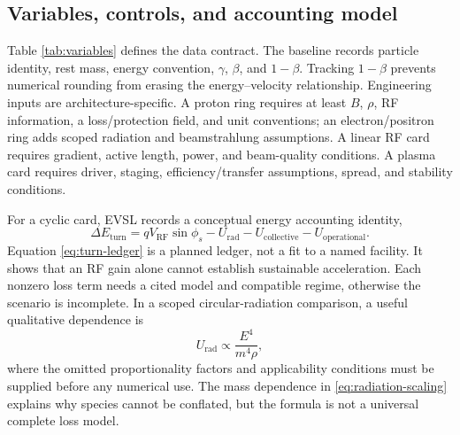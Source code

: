 \documentclass[conference]{../../../../Conference-LaTeX-template_10-17-19/IEEEtran}
\begin{document}
\subsection{Variables, controls, and accounting model}
Table \ref{tab:variables} defines the data contract. The baseline records particle identity, rest mass, energy convention, $\gamma$, $\beta$, and $1-\beta$. Tracking $1-\beta$ prevents numerical rounding from erasing the energy--velocity relationship. Engineering inputs are architecture-specific. A proton ring requires at least $B$, $\rho$, RF information, a loss/protection field, and unit conventions; an electron/positron ring adds scoped radiation and beamstrahlung assumptions. A linear RF card requires gradient, active length, power, and beam-quality conditions. A plasma card requires driver, staging, efficiency/transfer assumptions, spread, and stability conditions.

For a cyclic card, EVSL records a conceptual energy accounting identity,
\begin{equation}
\Delta E_{\mathrm{turn}}=qV_{\mathrm{RF}}\sin\phi_s-U_{\mathrm{rad}}-U_{\mathrm{collective}}-U_{\mathrm{operational}}.
\label{eq:turn-ledger}
\end{equation}
Equation \eqref{eq:turn-ledger} is a planned ledger, not a fit to a named facility. It shows that an RF gain alone cannot establish sustainable acceleration. Each nonzero loss term needs a cited model and compatible regime, otherwise the scenario is incomplete. In a scoped circular-radiation comparison, a useful qualitative dependence is
\begin{equation}
U_{\mathrm{rad}}\propto\frac{E^4}{m^4\rho},
\label{eq:radiation-scaling}
\end{equation}
where the omitted proportionality factors and applicability conditions must be supplied before any numerical use. The mass dependence in \eqref{eq:radiation-scaling} explains why species cannot be conflated, but the formula is not a universal complete loss model.
\end{document}

